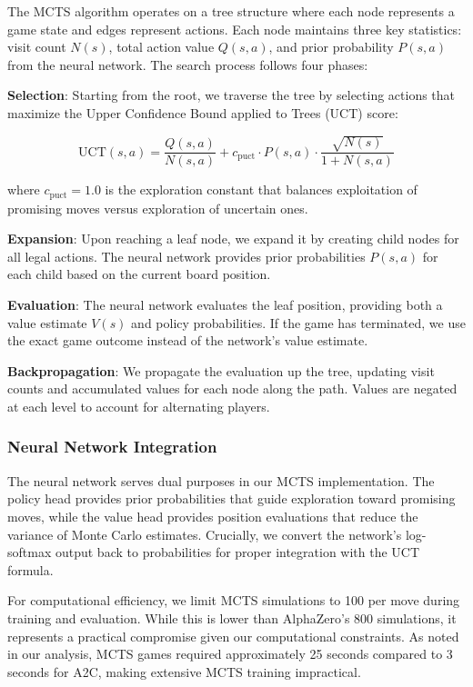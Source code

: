 \documentclass[conference]{IEEEtran}
\begin{document}
The MCTS algorithm operates on a tree structure where each node represents a game state and edges represent actions. Each node maintains three key statistics: visit count $N(s)$, total action value $Q(s,a)$, and prior probability $P(s,a)$ from the neural network. The search process follows four phases:

\textbf{Selection}: Starting from the root, we traverse the tree by selecting actions that maximize the Upper Confidence Bound applied to Trees (UCT) score:

\begin{equation}
\text{UCT}(s,a) = \frac{Q(s,a)}{N(s,a)} + c_{\text{puct}} \cdot P(s,a) \cdot \frac{\sqrt{N(s)}}{1 + N(s,a)}
\end{equation}

where $c_{\text{puct}} = 1.0$ is the exploration constant that balances exploitation of promising moves versus exploration of uncertain ones.

\textbf{Expansion}: Upon reaching a leaf node, we expand it by creating child nodes for all legal actions. The neural network provides prior probabilities $P(s,a)$ for each child based on the current board position.

\textbf{Evaluation}: The neural network evaluates the leaf position, providing both a value estimate $V(s)$ and policy probabilities. If the game has terminated, we use the exact game outcome instead of the network's value estimate.

\textbf{Backpropagation}: We propagate the evaluation up the tree, updating visit counts and accumulated values for each node along the path. Values are negated at each level to account for alternating players.

\subsubsection{Neural Network Integration}

The neural network serves dual purposes in our MCTS implementation. The policy head provides prior probabilities that guide exploration toward promising moves, while the value head provides position evaluations that reduce the variance of Monte Carlo estimates. Crucially, we convert the network's log-softmax output back to probabilities for proper integration with the UCT formula.

For computational efficiency, we limit MCTS simulations to 100 per move during training and evaluation. While this is lower than AlphaZero's 800 simulations, it represents a practical compromise given our computational constraints. As noted in our analysis, MCTS games required approximately 25 seconds compared to 3 seconds for A2C, making extensive MCTS training impractical.
\end{document}
